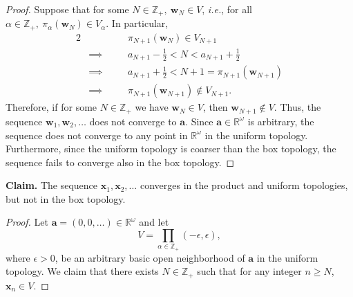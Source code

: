 \documentclass[a4paper,10pt]{article}
\newcommand{\bx}{\mathbf{x}}
\newcommand{\bw}{\mathbf{w}}
\newcommand{\ZZ}{\mathbb{Z}}
\newcommand{\RR}{\mathbb{R}}
\begin{document}
\begin{solution}
\begin{proof}
        Suppose that for some $N \in \ZZ_+,~ \bw_N \in V$, \textit{i.e.}, for all $\alpha \in \ZZ_+,~ \pi_\alpha(\bw_N) \in V_\alpha$.
        In particular,
        \begin{alignat*}{2}
            &           && \quad \pi_{N+1}(\bw_N) \in V_{N+1} \\
            & \implies  && \quad a_{N+1} - \tfrac{1}{2} < N < a_{N+1} + \tfrac{1}{2} \\
            & \implies  && \quad a_{N+1} + \tfrac{1}{2} < N + 1 = \pi_{N+1}(\bw_{N+1}) \\
            & \implies  && \quad \pi_{N+1}(\bw_{N+1}) \not\in V_{N+1}.
        \end{alignat*}
        Therefore, if for some $N \in \ZZ_+$ we have $\bw_N \in V$, then $\bw_{N+1} \not\in V$.
        Thus, the sequence $\bw_1, \bw_2, \ldots$ does not converge to $\mathbf{a}$.
        Since $\mathbf{a} \in \RR^\omega$ is arbitrary, the sequence does not converge to any point in $\RR^\omega$ in the uniform topology.
        Furthermore, since the uniform topology is coarser than the box topology, the sequence fails to converge also in the box topology.
    \end{proof}
    \bigskip

    \textbf{Claim.} The sequence $\bx_1, \bx_2, \ldots$ converges in the product and uniform topologies, but not in the box topology.
    \begin{proof}
        Let $\mathbf{a} = (0, 0, \ldots) \in \RR^\omega$ and let
        \begin{equation*}
            V = \prod_{\alpha \in \ZZ_+} (-\epsilon, \epsilon),
        \end{equation*}
        where $\epsilon > 0$, be an arbitrary basic open neighborhood of $\mathbf{a}$ in the uniform topology.
        We claim that there exists $N \in \ZZ_+$ such that for any integer $n \geq N$, $\bx_n \in V$.


\end{proof}
\end{solution}
\end{document}
